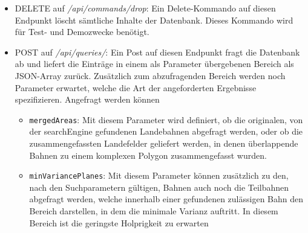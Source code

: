 \documentclass[10pt,a4paper]{report}
\begin{document}
\begin{itemize}
\begin{itemize}
	\end{itemize}
	\item DELETE auf \emph{/api/commands/drop}: Ein Delete-Kommando auf diesen Endpunkt löscht sämtliche Inhalte der Datenbank. Dieses Kommando wird für Test- und Demozwecke benötigt.
	\item POST auf \emph{/api/queries/}: Ein Post auf diesen Endpunkt fragt die Datenbank ab und liefert die Einträge in einem als Parameter übergebenen Bereich als JSON-Array zurück. Zusätzlich zum abzufragenden Bereich werden noch Parameter erwartet, welche die Art der angeforderten Ergebnisse spezifizieren. Angefragt werden können
		\begin{itemize}
			\item \texttt{mergedAreas}: Mit diesem Parameter wird definiert, ob die originalen, von der searchEngine gefundenen Landebahnen abgefragt werden, oder ob die zusammengefassten Landefelder geliefert werden, in denen überlappende Bahnen zu einem komplexen Polygon zusammengefasst wurden.
			\item \texttt{minVariancePlanes}: Mit diesem Parameter können zusätzlich zu den, nach den Suchparametern gültigen, Bahnen auch noch die Teilbahnen abgefragt werden, welche innerhalb einer gefundenen zulässigen Bahn den Bereich darstellen, in dem die minimale Varianz auftritt. In diesem Bereich ist die geringste Holprigkeit zu erwarten
		\end{itemize}
\end{itemize}
\end{document}
